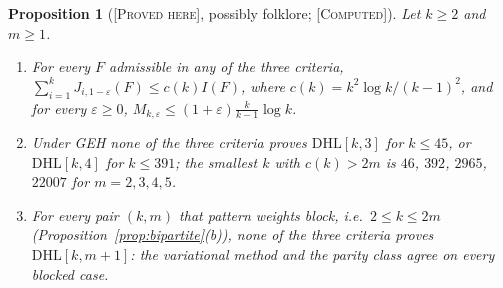 \documentclass[11pt]{amsart}
\newtheorem{proposition}[theorem]{Proposition}
\theoremstyle{definition}
\theoremstyle{remark}
\newcommand{\lbl}[1]{\textup{\textsc{[#1]}}}
\begin{document}
\begin{proposition}[\lbl{Proved here}, possibly folklore; \lbl{Computed}]\label{prop:ceil}
Let $k\ge2$ and $m\ge1$.
\begin{enumerate}
\item For every $F$ admissible in any of the three criteria,
  $\sum_{i=1}^kJ_{i,1-\varepsilon}(F)\le c(k)I(F)$, where
  $c(k)=k^2\log k/(k-1)^2$,
  and for every $\varepsilon\ge0$,
  $M_{k,\varepsilon}\le(1+\varepsilon)\frac k{k-1}\log k$.
\item Under GEH none of the three criteria proves $\mathrm{DHL}[k,3]$ for
  $k\le45$, or $\mathrm{DHL}[k,4]$ for $k\le391$; the smallest $k$ with
  $c(k)>2m$ is $46$, $392$, $2965$, $22007$ for $m=2,3,4,5$.
\item For every pair $(k,m)$ that pattern weights block, i.e.\ $2\le k\le2m$
  (Proposition~\ref{prop:bipartite}(b)), none of the three criteria proves
  $\mathrm{DHL}[k,m+1]$: the variational method and the parity class agree on
  every blocked case.
\end{enumerate}
\end{proposition}
\end{document}
